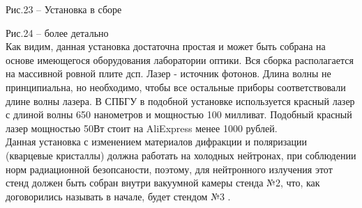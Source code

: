 \documentclass[11pt]{report}
\begin{document}
Рис.23 -- Установка в сборе  \\

\begin{figure}[h]
\end{figure}

Рис.24 -- более детально\\

Как видим, данная установка достаточна простая и может быть собрана на основе имеющегося оборудования лаборатории оптики. Вся сборка располагается на массивной ровной плите дсп. Лазер - источник фотонов. Длина волны не принципиальна, но необходимо, чтобы все остальные приборы соответствовали длине волны лазера. В СПБГУ в подобной установке используется красный лазер с длиной волны 650 нанометров и мощностью 100 милливат. Подобный красный лазер мощностью 50Вт стоит на AliExpress менее 1000 рублей. \\

Данная установка с изменением материалов дифракции и поляризации (кварцевые кристаллы) должна работать на холодных нейтронах, при соблюдении норм радиационной безопсаности, поэтому, для нейтронного излучения этот стенд должен быть собран внутри вакуумной камеры стенда №2, что, как договорились называть в начале, будет стендом №3 .
\end{document}
